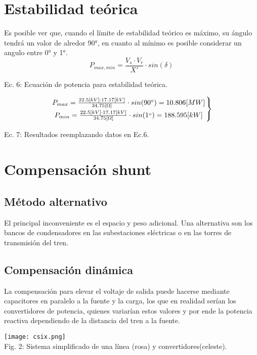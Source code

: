 \documentclass[conference]{IEEEtran}
\begin{document}
\section{Estabilidad teórica}
Es posible ver que, cuando el límite de estabilidad teórico es máximo, su ángulo tendrá un valor de alredor 90°, en cuanto al mínimo es
posible considerar un angulo entre 0° y 1°.
$$
P_{max,min} = \frac{V_{s} \cdot V_{r}}{{X}'}\cdot sin(\delta )
$$
\begin{center}
\small{Ec. 6: Ecuación de potencia para estabilidad teórica.}
\end{center}
$$
\left. P_{max} = \frac{22.5 [kV] \cdot 17.17 [kV]}{34.75 [\Omega]}\cdot sin(90^{\circ}) =
10.806[MW]
\atop P_{min} = \frac{22.5 [kV] \cdot 17.17 [kV]}{34.75 [\Omega]}\cdot sin(1^{\circ}) = 188.595[kW]\right\}
$$
\begin{center}
\small{Ec. 7: Resultados reemplazando datos en Ec.6.}
\end{center}

\section{Compensación shunt}
\subsection{Método alternativo}
El principal inconveniente es el espacio y peso adicional. Una alternativa son los bancos de condensadores en las subestaciones eléctricas o en las torres de transmisión del tren.
\subsection{Compensación dinámica}
La compensación para elevar el voltaje de salida puede hacerse mediante capacitores en paralelo a la fuente y la carga, los que en realidad serían los convertidores de potencia, quienes variarían estos valores y por ende la potencia reactiva dependiendo de la distancia del tren a la fuente.
\begin{center}
\texttt{[image: csix.png]}\\
\small {Fig. 2: Sistema simplificado de una línea (rosa) y convertidores(celeste).}
\end{center}
\end{document}
